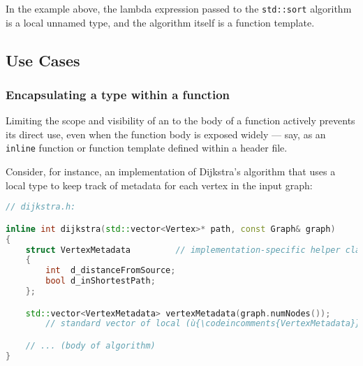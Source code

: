 \noindent In the example above, the lambda expression passed to the
\lstinline!std::sort! algorithm is a local unnamed type, and the algorithm
itself is a function template.

\subsection[Use Cases]{Use Cases}\label{use-cases}

\subsubsection[Encapsulating a type within a function]{Encapsulating a type within a function}\label{encapsulating-a-type-within-a-function}

Limiting the scope and visibility of an  to the body of a
function actively prevents its direct use, even when the function body
is exposed widely --- say, as an \lstinline!inline! function or function
template defined within a header file.

Consider, for instance, an implementation of Dijkstra's algorithm that
uses a local type to keep track of metadata for each vertex in the input
graph:

\begin{lstlisting}[language=C++]
// dijkstra.h:

inline int dijkstra(std::vector<Vertex>* path, const Graph& graph)
{
    struct VertexMetadata         // implementation-specific helper class
    {
        int  d_distanceFromSource;
        bool d_inShortestPath;
    };

    std::vector<VertexMetadata> vertexMetadata(graph.numNodes());
        // standard vector of local (ù{\codeincomments{VertexMetadata}}ù) objects -- one per vertex

    // ... (body of algorithm)
}
\end{lstlisting}

